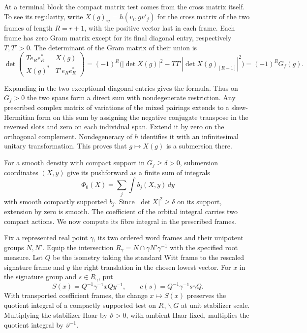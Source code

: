 At a terminal block the compact matrix test comes from the cross matrix itself. To see its regularity, write \(X(g)_{ij}=h(v_i,gv'_j)\) for the cross matrix of the two frames of length \(R=r+1\), with the positive vector last in each frame. Each frame has zero Gram matrix except for its final diagonal entry, respectively \(T,T'>0\). The determinant of the Gram matrix of their union is
\[
 \det\begin{pmatrix}
 T e_Re_R^*&X(g)\\ X(g)^*&T'e_Re_R^*
 \end{pmatrix}
 =(-1)^R\bigl(|\det X(g)|^2-TT'|\det X(g)_{[R-1]}|^2\bigr)
 =(-1)^R G_f(g).
\]

Expanding in the two exceptional diagonal entries gives the formula. Thus on \(G_f>0\) the two spans form a direct sum with nondegenerate restriction. Any prescribed complex matrix of variations of the mixed pairings extends to a skew-Hermitian form on this sum by assigning the negative conjugate transpose in the reversed slots and zero on each individual span. Extend it by zero on the orthogonal complement. Nondegeneracy of \(h\) identifies it with an infinitesimal unitary transformation. This proves that \(g\mapsto X(g)\) is a submersion there.

For a smooth density with compact support in \(G_f\ge\delta>0\), submersion coordinates \((X,y)\) give its pushforward as a finite sum of integrals
\[
                    \Phi_0(X)=\sum_j\int b_j(X,y)\,dy
\]
with smooth compactly supported \(b_j\). Since \(|\det X|^2\ge\delta\) on its support, extension by zero is smooth. The coefficient of the orbital integral carries two compact actions. We now compute its fibre integral in the prescribed frames.

\begin{auxlemma}\label{lem:orbital-frame-transport}
Fix a represented real point \(\gamma\), its two ordered word frames
and their unipotent groups \(N,N'\). Equip the intersection
\(R_\gamma=N\cap\gamma N'\gamma^{-1}\) with the specified root
measure. Let \(Q\) be the isometry taking the standard Witt frame
to the rescaled signature frame and \(y\) the right translation in
the chosen lowest vector. For \(x\) in the signature group and
\(s\in R_\gamma\), put
\[
 S(x)=Q^{-1}\gamma^{-1}xQy^{-1},\qquad
 c(s)=Q^{-1}\gamma^{-1}s\gamma Q .
\]
With transported coefficient frames, the change \(x\mapsto S(x)\)
preserves the quotient integral of a compactly supported test on
\(R_\gamma\backslash G\) at unit stabilizer scale. Multiplying
the stabilizer Haar by \(\vartheta>0\), with ambient Haar fixed,
multiplies the quotient integral by \(\vartheta^{-1}\).
\end{auxlemma}

